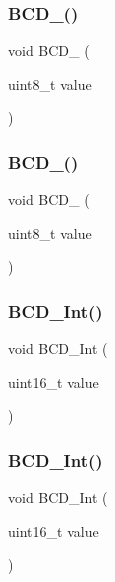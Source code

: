 \mbox{\label{lcd_8c_a5d6d939f94e00c827e9be235c12e458f}} 
\subsubsection{B\+C\+D\+\_()}
{\footnotesize\ttfamily void B\+C\+D\+\_ (\begin{DoxyParamCaption}\item[{uint8\+\_\+t}]{value }\end{DoxyParamCaption})}

\mbox{\label{lcd_8c_ab69e11ffc7dd32db82ce7c6f6572b03c}} 
\subsubsection{B\+C\+D\+\_()}
{\footnotesize\ttfamily void B\+C\+D\+\_ (\begin{DoxyParamCaption}\item[{uint8\+\_\+t}]{value }\end{DoxyParamCaption})}

\mbox{\label{lcd_8c_ac90bf7d17031c7d3c47b68e80fb251be}} 
\subsubsection{B\+C\+D\+\_\+Int()}
{\footnotesize\ttfamily void B\+C\+D\+\_\+Int (\begin{DoxyParamCaption}\item[{uint16\+\_\+t}]{value }\end{DoxyParamCaption})}

\mbox{\label{lcd_8c_a67578ffcce8e8fd0199734024cca71a8}} 
\subsubsection{B\+C\+D\+\_\+Int()}
{\footnotesize\ttfamily void B\+C\+D\+\_\+Int (\begin{DoxyParamCaption}\item[{uint16\+\_\+t}]{value }\end{DoxyParamCaption})}

